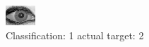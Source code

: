 \begin{figure}[h!]
\begin{center}
\includegraphics[width=0.60\columnwidth]{figures/ID1998_class_1_target_2.png}
\end{center}
\caption{ Classification: 1 actual target: 2}
\label{fig:ID1998_class_1_target_2}
\end{figure}
